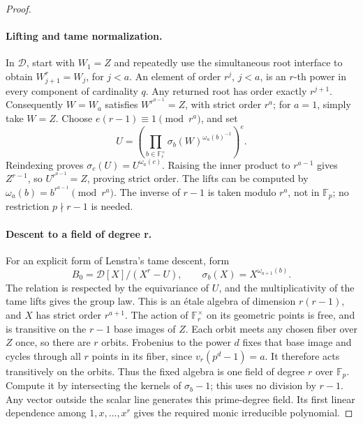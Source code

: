 \documentclass[11pt]{article}
\theoremstyle{definition}
\theoremstyle{remark}
\begin{document}
\begin{proof}
\paragraph{Lifting and tame normalization.}
In \(\mathcal D\), start with \(W_1=Z\) and repeatedly use
the simultaneous root interface to obtain \(W_{j+1}^r=W_j\),
for \(j<a\). An element of order \(r^j\), \(j<a\), is an
\(r\)-th power in every component of cardinality \(q\).
Any returned root has order exactly \(r^{j+1}\). Consequently
\(W=W_a\) satisfies \(W^{r^{a-1}}=Z\), with strict order
\(r^a\); for \(a=1\), simply take \(W=Z\).
Choose \(e(r-1)\equiv1\pmod{r^a}\), and set
\[
 U=\left(\prod_{b\in\mathbb F_r^\times}
             \sigma_b(W)^{\omega_a(b)^{-1}}\right)^e.
\]
Reindexing proves \(\sigma_c(U)=U^{\omega_a(c)}\).
Raising the inner product to \(r^{a-1}\) gives
\(Z^{r-1}\), so \(U^{r^{a-1}}=Z\), proving strict order.
The lifts can be computed by
\(\omega_a(b)=b^{r^{a-1}}\pmod{r^a}\).
The inverse of \(r-1\) is taken modulo \(r^a\), not in
\(\mathbb F_p\); no restriction \(p\nmid r-1\) is needed.

\paragraph{Descent to a field of degree r.}
For an explicit form of Lenstra's tame descent, form
\[
 B_0=\mathcal D[X]/(X^r-U),\qquad
 \sigma_b(X)=X^{\omega_{a+1}(b)}.
\]
The relation is respected by the equivariance of \(U\), and
the multiplicativity of the tame lifts gives the group law.
This is an \'etale algebra of dimension \(r(r-1)\),
and \(X\) has strict order \(r^{a+1}\).
The action of \(\mathbb F_r^\times\) on its geometric points
is free, and is transitive on the \(r-1\) base images of \(Z\).
Each orbit meets any chosen fiber over \(Z\) once, so there are
\(r\) orbits. Frobenius to the power \(d\) fixes that base
image and cycles through all \(r\) points in its fiber, since
\(v_r(p^d-1)=a\). It therefore acts transitively on the orbits.
Thus the fixed algebra is one field of degree \(r\) over
\(\mathbb F_p\). Compute it by intersecting the kernels of
\(\sigma_b-1\); this uses no division by \(r-1\).
Any vector outside the scalar line generates this prime-degree
field. Its first linear dependence among \(1,x,\ldots,x^r\)
gives the required monic irreducible polynomial.


\end{proof}
\end{document}
